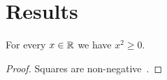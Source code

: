 \section{Results}
\begin{theorem}\label{thm:main}
For every $x \in \mathbb{R}$ we have $x^2 \ge 0$.
\end{theorem}
\begin{proof}
Squares are non-negative~\cite{sample}.
\end{proof}

